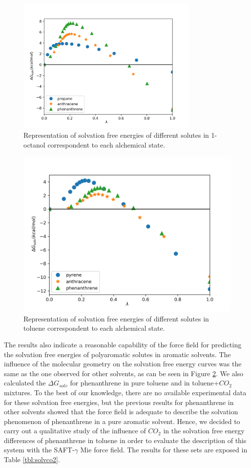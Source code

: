 \begin{figure}[H]
	\centering
	\includegraphics[width=0.8\textwidth]{Figures/oct}
	\caption{Representation of solvation free energies of different solutes in 1-octanol correspondent to each alchemical state.}
	\label{fig:oct}
\end{figure}

\begin{figure}[H]
	\centering
	\includegraphics[width=0.8\linewidth]{Figures/tol}
	\caption{Representation of solvation free energies of different solutes in toluene correspondent to each alchemical state. }
	\label{fig:tol}
\end{figure}

The results also indicate a reasonable capability of the force field for predicting the solvation free energies of polyaromatic solutes in aromatic solvents. The influence of the molecular geometry on the solvation free energy curves was the same as the one observed for other solvents, as can be seen in Figure \ref{fig:tol}.  We also calculated the $\Delta G_{solv}$ for phenanthrene in pure toluene and in toluene+$CO_{2}$ mixtures. To the best of our knowledge, there are no available experimental data for these solvation free energies, but the previous results for phenanthrene in other solvents showed that the force field is adequate to describe the solvation phenomenon of phenanthrene in a pure aromatic solvent. Hence, we decided to carry out a qualitative study of the influence of $CO_{2}$ in the solvation free energy differences of phenanthrene in toluene in order to evaluate the description of this system with the SAFT-$\gamma$ Mie force field. The results for these sets are exposed in Table \ref{tbl:solvco2}.  


